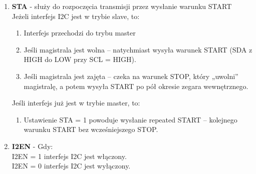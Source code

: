 \documentclass{article}
\begin{document}
\begin{itemize}
\begin{enumerate}
        \item \textbf{STA} - służy do rozpoczęcia transmisji przez wysłanie warunku START\\
                Jeżeli interfejs I2C jest w trybie slave, to:\\
                \begin{enumerate}
                    \item Interfejs przechodzi do trybu master
                    \item Jeśli magistrala jest wolna – natychmiast wysyła warunek START (SDA z HIGH do LOW przy SCL = HIGH).
                    \item Jeśli magistrala jest zajęta – czeka na warunek STOP, który „uwolni” magistralę, a potem wysyła START po pół okresie zegara wewnętrznego.
                \end{enumerate}
                Jeśli interfejs już jest w trybie master, to:\\
                \begin{enumerate}
                    \item Ustawienie STA = 1 powoduje wysłanie repeated START – kolejnego warunku START bez wcześniejszego STOP.
                \end{enumerate}
                            

        \item \textbf{I2EN} - Gdy:\\
            I2EN = 1 interfejs I2C jest włączony.\\
            I2EN = 0 interfejs I2C jest wyłączony.
        
        
        

\end{enumerate}
\end{itemize}
\end{document}
